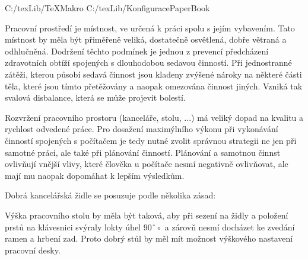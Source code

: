\def\addr{C:/texLib}

 \addr/TeXMakro
\setAddress{\addr}
 \addr/KonfiguracePaperBook



\Obsah






Pracovní prostředí je místnost, ve určená k práci spolu s jejím vybavením. Tato místnost by měla být přiměřeně veliká, dostatečně osvětlená, dobře větraná a odhlučněná. Dodržení těchto podmínek je jednou z prevencí předcházení zdravotních obtíží spojených s dlouhodobou sedavou činností. Při jednostranné zátěži, kterou působí sedavá činnost jsou kladeny zvýšené nároky na některé části těla, které jsou tímto přetěžovány a naopak omezována činnost jiných. Vzniká tak svalová disbalance, která se může projevit bolestí.

Rozvržení pracovního prostoru (kanceláře, stolu, ...)  má veliký dopad na kvalitu a rychlost odvedené práce. Pro dosažení maximýlního výkonu při vykonávání činností spojených s počítačem je tedy nutné zvolit správnou strategii ne jen při samotné práci, ale také při plánování činností. Plánování a samotnou činnst ovlivňují vnější vlivy, které člověka u počítače nesmí negativně ovlivňovat, ale mají mu naopak dopomáhat k lepším výsledkům.

Dobrá kancelářská židle se posuzuje podle několika zásad:
\vskip 4mm
\vskip 4mm


Výška pracovního stolu by měla být taková, aby při sezení na židly a položení prstů na klávesnici svýraly lokty úhel $90ˆ\circ$ a zárovň nesmí docházet ke zvedání ramen a hrbení zad. Proto dobrý stůl by měl mít možnost výškového nastavení pracovní desky.

